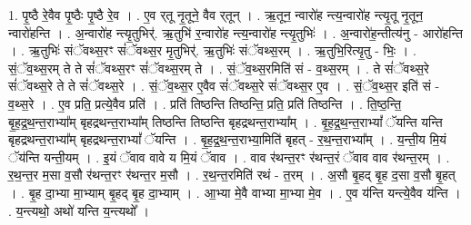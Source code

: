 \documentclass[17pt]{extarticle}
\begin{document}
1. पृ॒ष्ठै रे॒वैव पृ॒ष्ठैः पृ॒ष्ठै रे॒व । . ए॒व र्‌तू नृ॒तूने॒ वैव र्‌तून् । . ऋ॒तून॒ न्वारो॑ह न्त्य॒न्वारो॑ह न्त्यृ॒तू नृ॒तून॒ न्वारो॑हन्ति । . अ॒न्वारो॑ह न्त्यृ॒तुभिर्॑. ऋ॒तुभि॑ र॒न्वारो॑ह न्त्य॒न्वारो॑ह न्त्यृ॒तुभिः॑ । . अ॒न्वारो॑ह॒न्तीत्य॑नु - आरो॑हन्ति । . ऋ॒तुभिः॑ संॅवथ्स॒रꣳ सं॑ॅवथ्स॒र मृ॒तुभिर्॑. ऋ॒तुभिः॑ संॅवथ्स॒रम् । . ऋ॒तुभि॒रित्यृ॒तु - भिः॒ । . सं॒ॅव॒थ्स॒रम् ते ते सं॑ॅवथ्स॒रꣳ सं॑ॅवथ्स॒रम् ते । . सं॒ॅव॒थ्स॒रमिति॑ सं - व॒थ्स॒रम् । . ते सं॑ॅवथ्स॒रे सं॑ॅवथ्स॒रे ते ते सं॑ॅवथ्स॒रे । . सं॒ॅव॒थ्स॒र ए॒वैव सं॑ॅवथ्स॒रे सं॑ॅवथ्स॒र ए॒व । . सं॒ॅव॒थ्स॒र इति॑ सं - व॒थ्स॒रे । . ए॒व प्रति॒ प्रत्ये॒वैव प्रति॑ । . प्रति॑ तिष्ठन्ति तिष्ठन्ति॒ प्रति॒ प्रति॑ तिष्ठन्ति । . ति॒ष्ठ॒न्ति॒ बृ॒ह॒द्र॒थ॒न्त॒राभ्या᳚म् बृहद्रथन्त॒राभ्या᳚म् तिष्ठन्ति तिष्ठन्ति बृहद्रथन्त॒राभ्या᳚म् । . बृ॒ह॒द्र॒थ॒न्त॒राभ्यां᳚ ॅयन्ति यन्ति बृहद्रथन्त॒राभ्या᳚म् बृहद्रथन्त॒राभ्यां᳚ ॅयन्ति । . बृ॒ह॒द्र॒थ॒न्त॒राभ्या॒मिति॑ बृहत् - र॒थ॒न्त॒राभ्या᳚म् । . य॒न्ती॒य मि॒यं ॅय॑न्ति यन्ती॒यम् । . इ॒यं ॅवाव वावे य मि॒यं ॅवाव । . वाव र॑थन्त॒रꣳ र॑थन्त॒रं ॅवाव वाव र॑थन्त॒रम् । . र॒थ॒न्त॒र म॒सा व॒सौ र॑थन्त॒रꣳ र॑थन्त॒र म॒सौ । . र॒थ॒न्त॒रमिति॑ रथं - त॒रम् । . अ॒सौ बृ॒हद् बृ॒ह द॒सा व॒सौ बृ॒हत् । . बृ॒ह दा॒भ्या मा॒भ्याम् बृ॒हद् बृ॒ह दा॒भ्याम् । . आ॒भ्या मे॒वै वाभ्या मा॒भ्या मे॒व । . ए॒व य॑न्ति यन्त्ये॒वैव य॑न्ति । . य॒न्त्यथो॒ अथो॑ यन्ति य॒न्त्यथो᳚ । \newline
\end{document}
